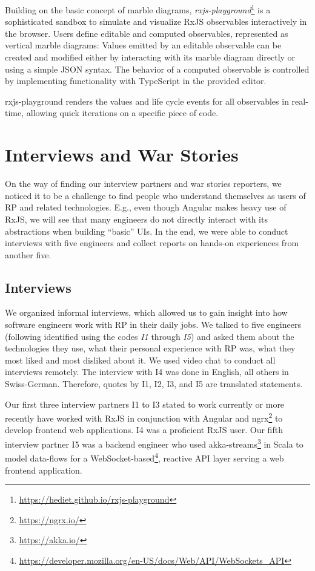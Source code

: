 \documentclass[sigplan,screen]{acmart}
\begin{document}
Building on the basic concept of marble diagrams, \emph{rxjs-playground}\footnote{\url{https://hediet.github.io/rxjs-playground}} is a sophisticated sandbox to simulate and visualize RxJS observables interactively in the browser. Users define editable and computed observables, represented as vertical marble diagrams: Values emitted by an editable observable can be created and modified either by interacting with its marble diagram directly or using a simple JSON syntax. The behavior of a computed observable is controlled by implementing functionality with TypeScript in the provided editor.

rxjs-playground renders the values and life cycle events for all observables in real-time, allowing quick iterations on a specific piece of code.


\section{Interviews and War Stories}
\label{sec:interviews}

On the way of finding our interview partners and war stories reporters, we noticed it to be a challenge to find people who understand themselves as users of RP and related technologies. E.g., even though Angular makes heavy use of RxJS, we will see that many engineers do not directly interact with its abstractions when building ``basic'' UIs. In the end, we were able to conduct interviews with five engineers and collect reports on hands-on experiences from another five.

\subsection{Interviews}

We organized informal interviews, which allowed us to gain insight into how software engineers work with RP in their daily jobs. We talked to five engineers (following identified using the codes \emph{I1} through \emph{I5}) and asked them about the technologies they use, what their personal experience with RP was, what they most liked and most disliked about it. We used video chat to conduct all interviews remotely. The interview with I4 was done in English, all others in Swiss-German. Therefore, quotes by I1, I2, I3, and I5 are translated statements.

Our first three interview partners I1 to I3 stated to work currently or more recently have worked with RxJS in conjunction with Angular and ngrx\footnote{\url{https://ngrx.io/}} to develop frontend web applications. I4 was a proficient RxJS user. Our fifth interview partner I5 was a backend engineer who used akka-streams\footnote{\url{https://akka.io/}} in Scala to model data-flows for a WebSocket-based\footnote{\url{https://developer.mozilla.org/en-US/docs/Web/API/WebSockets_API}}, reactive API layer serving a web frontend application.
\end{document}

